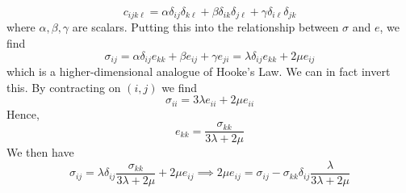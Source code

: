 \[ c_{ijk\ell} = \alpha \delta_{ij}\delta_{k\ell} + \beta \delta_{ik}\delta_{j\ell} + \gamma \delta_{i\ell}\delta_{jk} \]
where \(\alpha, \beta, \gamma\) are scalars. Putting this into the relationship between \(\sigma\) and \(e\), we find
\[ \sigma_{ij} = \alpha \delta_{ij}e_{kk} + \beta e_{ij} + \gamma e_{ji} = \lambda \delta_{ij} e_{kk} + 2\mu e_{ij} \]
which is a higher-dimensional analogue of Hooke's Law. We can in fact invert this. By contracting on \((i, j)\) we find
\[ \sigma_{ii} = 3\lambda e_{ii} + 2\mu e_{ii} \]
Hence,
\[ e_{kk} = \frac{\sigma_{kk}}{3\lambda + 2\mu} \]
We then have
\[ \sigma_{ij} = \lambda \delta_{ij} \frac{\sigma_{kk}}{3\lambda + 2\mu} + 2\mu e_{ij} \implies 2\mu e_{ij} = \sigma_{ij} - \sigma_{kk} \delta_{ij} \frac{\lambda}{3\lambda + 2\mu} \]
